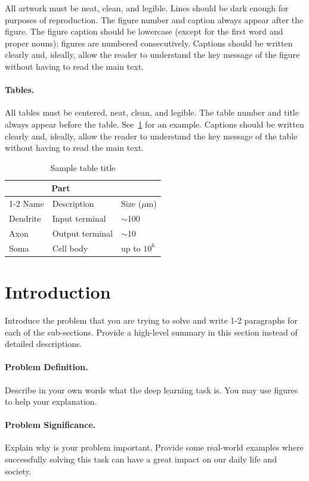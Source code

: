 \documentclass{article}
\begin{document}
All artwork must be neat, clean, and legible. Lines should be dark enough for
purposes of reproduction. The figure number and caption always appear after the figure. The figure caption should be lowercase (except for the first word and
proper nouns); figures are numbered consecutively. Captions should be written clearly and, ideally, allow the reader to understand the key message of the figure without having to read the main text.


\paragraph{Tables.}
All tables must be centered, neat, clean, and legible.  The table number and
title always appear before the table. See~\cref{sample-table} for an example.
Captions should be written clearly and, ideally, allow the reader to understand the key message of the table without having to read the main text.
\begin{table}[h]
  \caption{Sample table title}
  \label{sample-table}
  \centering
  \begin{tabular}{lll}
    \toprule
    \multicolumn{2}{c}{Part}                   \\
    \cmidrule(r){1-2}
    Name     & Description     & Size ($\mu$m) \\
    \midrule
    Dendrite & Input terminal  & $\sim$100     \\
    Axon     & Output terminal & $\sim$10      \\
    Soma     & Cell body       & up to $10^6$  \\
    \bottomrule
  \end{tabular}
\end{table}

\section{Introduction}
\label{sec:intro}
Introduce the problem that you are trying to solve and write 1-2 paragraphs for each of the sub-sections.  Provide a high-level summary in this section instead of detailed descriptions.
\paragraph{Problem Definition.}
Describe in your own words what the deep learning task is.  You may use figures to help your explanation.

\paragraph{Problem Significance.}
Explain  why is your problem important. Provide some real-world examples where successfully solving this task can have a great impact on our daily life and society. 
\end{document}
